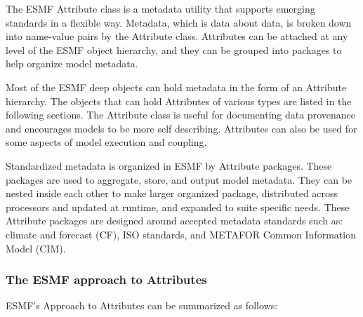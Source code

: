 %


The ESMF Attribute class is a metadata utility that supports emerging standards 
in a flexible way.  Metadata, which is data about data, is broken down into 
name-value pairs by the Attribute class.  Attributes can be attached at any 
level of the ESMF object hierarchy, and they can be grouped into packages to 
help organize model metadata.  

Most of the ESMF deep objects can hold metadata in the form of an Attribute 
hierarchy.  The objects that can hold Attributes of various types are listed in 
the following sections.  The Attribute class is useful for documenting data 
provenance and encourages models to be more self describing.  Attributes can 
also be used for some aspects of model execution and coupling.

Standardized metadata is organized in ESMF by Attribute packages.  These 
packages are used to aggregate, store, and output model metadata.  They can be 
nested inside each other to make larger organized package, distributed across 
processors and updated at runtime, and expanded to suite specific needs.  These 
Attribute packages are designed around accepted metadata standards such as: 
climate and forecast (CF), ISO standards, and METAFOR Common Information Model 
(CIM).

\subsubsection{The ESMF approach to Attributes}

ESMF's Approach to Attributes can be summarized as follows:

